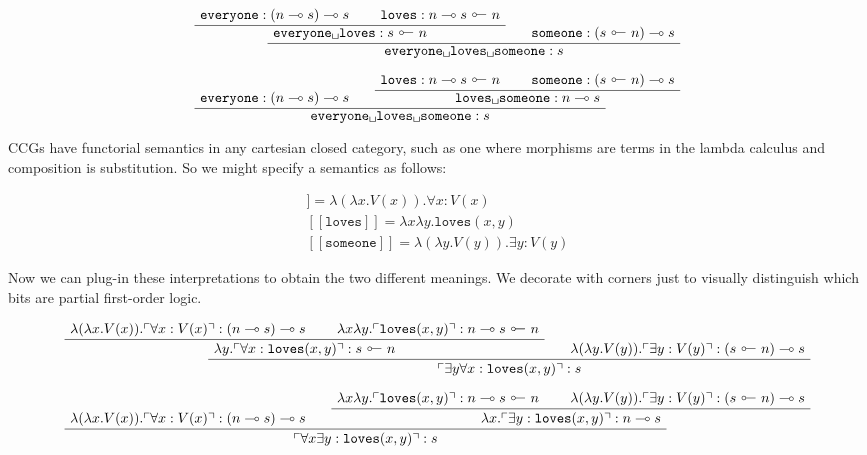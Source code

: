 \begin{fullwidth}
\begin{example}
\[
\AxiomC{$\texttt{everyone} : (n \multimap s) \multimap s$}
\AxiomC{$\texttt{loves} : n \multimap s \ \rotatebox[origin=c]{180}{$\multimap$} \ n$}
\BinaryInfC{$\texttt{everyone\textvisiblespace loves} : s \ \rotatebox[origin=c]{180}{$\multimap$} \ n$}
\AxiomC{$\texttt{someone} : (s \ \rotatebox[origin=c]{180}{$\multimap$} \ n) \multimap s$}
\BinaryInfC{$\texttt{everyone\textvisiblespace loves\textvisiblespace someone} : s$}
\DisplayProof
\]

\[
\AxiomC{$\texttt{everyone} : (n \multimap s) \multimap s$}
\AxiomC{$\texttt{loves} : n \multimap s \ \rotatebox[origin=c]{180}{$\multimap$} \ n$}
\AxiomC{$\texttt{someone} : (s \ \rotatebox[origin=c]{180}{$\multimap$} \ n) \multimap s$}
\BinaryInfC{$\texttt{loves\textvisiblespace someone} : n \multimap s$}
\BinaryInfC{$\texttt{everyone\textvisiblespace loves\textvisiblespace someone} : s$}
\DisplayProof
\]

CCGs have functorial semantics in any cartesian closed category, such as one where morphisms are terms in the lambda calculus and composition is substitution. So we might specify a semantics as follows:

\begin{align}
[\![ \texttt{everyone} ]\!] = \lambda (\lambda x . V(x)) . \forall x : V(x) \\
[\![ \texttt{loves} ]\!] = \lambda x \lambda y . \texttt{loves}(x,y) \\
[\![ \texttt{someone} ]\!] = \lambda (\lambda y . V(y)) . \exists y : V(y)
\end{align}

Now we can plug-in these interpretations to obtain the two different meanings. We decorate with corners just to visually distinguish which bits are partial first-order logic.

\[
\AxiomC{$\lambda (\lambda x . V(x)) . \ulcorner \forall x : V(x) \urcorner : (n \multimap s) \multimap s$}
\AxiomC{$\lambda x \lambda y . \ulcorner \texttt{loves}(x,y) \urcorner : n \multimap s \ \rotatebox[origin=c]{180}{$\multimap$} \ n$}
\BinaryInfC{$ \lambda y . \ulcorner \forall x : \texttt{loves}(x,y) \urcorner : s \ \rotatebox[origin=c]{180}{$\multimap$} \ n$}
\AxiomC{$\lambda (\lambda y . V(y)) . \ulcorner \exists y : V(y) \urcorner : (s \ \rotatebox[origin=c]{180}{$\multimap$} \ n) \multimap s$}
\BinaryInfC{$ \ulcorner \exists y \forall x : \texttt{loves}(x,y) \urcorner : s$}
\DisplayProof
\]

\[
\AxiomC{$\lambda (\lambda x . V(x)) . \ulcorner \forall x : V(x) \urcorner : (n \multimap s) \multimap s$}
\AxiomC{$\lambda x \lambda y . \ulcorner \texttt{loves}(x,y) \urcorner : n \multimap s \ \rotatebox[origin=c]{180}{$\multimap$} \ n$}
\AxiomC{$\lambda (\lambda y . V(y)) . \ulcorner \exists y : V(y) \urcorner : (s \ \rotatebox[origin=c]{180}{$\multimap$} \ n) \multimap s$}
\BinaryInfC{$\lambda x . \ulcorner \exists y : \texttt{loves}(x,y) \urcorner : n \multimap s$}
\BinaryInfC{$ \ulcorner \forall x \exists y : \texttt{loves}(x,y) \urcorner : s$}
\DisplayProof
\]


\end{example}
\end{fullwidth}
